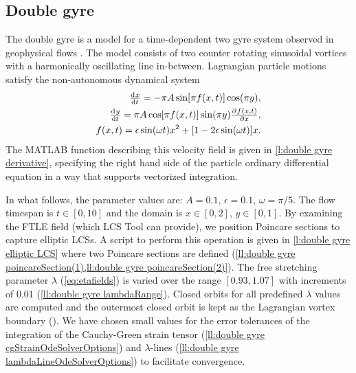 \documentclass[5p]{elsarticle}
\begin{document}
\subsection{Double gyre}
\label{sec:double gyre}

The double gyre is a model for a time-dependent two gyre system observed in geophysical flows \citep{shadden05:_defin_lagran_lyapun}. The model consists of two counter rotating sinusoidal vortices with a harmonically oscillating line in-between. Lagrangian particle motions satisfy the non-autonomous dynamical system
\begin{equation}
\begin{split}
\od{x}{t} = -\pi A \sin[\pi f(x,t)] \cos(\pi y),\\
\od{y}{t} = \pi A \cos[\pi f(x,t)] \sin(\pi y) \pd{f(x,t)}{x},\\
f(x,t) = \epsilon \sin(\omega t) x^2 + [1 - 2 \epsilon \sin(\omega t)] x.
\end{split}
\label{eq:double gyre derivative equations}
\end{equation}
The MATLAB function describing this velocity field is given in \cref{l:double gyre derivative}, specifying the right hand side of the particle ordinary differential equation in a way that supports vectorized integration.



In what follows, the parameter values are: $A = 0.1$, $\epsilon = 0.1$, $\omega = \pi/5$.
The flow timespan is $t \in [0,10]$ and the domain is $x \in [0,2]$, $y \in [0,1]$.
By examining the FTLE field (which LCS Tool can provide), we position Poincare sections to capture elliptic LCSs.
A script to perform this operation is given in \cref{l:double gyre elliptic LCS} where two Poincare sections are defined (\cref{ll:double gyre poincareSection(1),ll:double gyre poincareSection(2)}).
The free stretching parameter $\lambda$ (\cref{eq:etafields}) is varied over the range $[0.93,1.07]$ with increments of $0.01$ (\cref{ll:double gyre lambdaRange}).
Closed orbits for all predefined $\lambda$ values are computed and the outermost closed orbit is kept as the Lagrangian vortex boundary  ().
We have chosen small values for the error tolerances of the integration of the Cauchy-Green strain tensor (\cref{ll:double gyre cgStrainOdeSolverOptions}) and $\lambda$-lines (\cref{ll:double gyre lambdaLineOdeSolverOptions}) to facilitate convergence.
\end{document}
